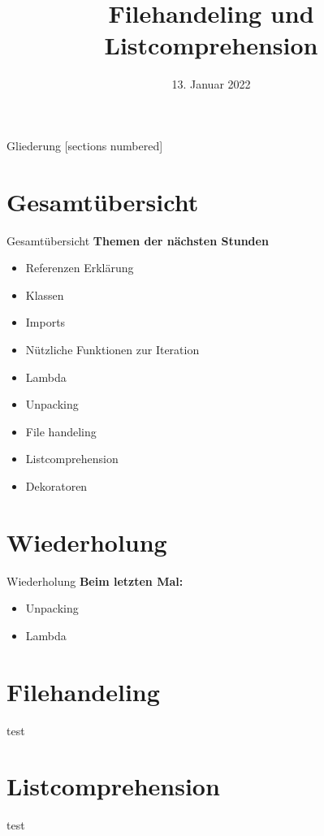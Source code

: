 



\title{Filehandeling und Listcomprehension}
\date{13. Januar 2022}


	
\maketitle

\begin{frame}{Gliederung}
	[sections numbered]
	\tableofcontents
\end{frame}

\section*{Gesamtübersicht}
\begin{frame}{Gesamtübersicht}
	\textbf{Themen der nächsten Stunden}
	\begin{itemize}
		\item Referenzen Erklärung
		\item  Klassen
		\item Imports
		\item Nützliche Funktionen zur Iteration
		\item Lambda
		\item Unpacking
		\item \alert{File handeling}
		\item \alert{Listcomprehension}
		\item Dekoratoren
	\end{itemize}
\end{frame}

\section{Wiederholung}
\begin{frame}{Wiederholung}
	\textbf{Beim letzten Mal:}
	\begin{itemize}
		\item Unpacking
		
		
		\item Lambda
		
	\end{itemize}	
\end{frame}

\section{Filehandeling}
\begin{frame}{test}
	
\end{frame}

\section{Listcomprehension}
\begin{frame}{test}
	
\end{frame}


